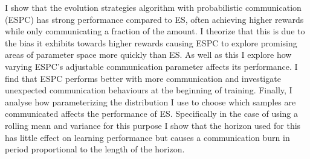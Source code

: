 I show that the evolution strategies algorithm with probabilistic communication (ESPC) has strong performance compared to ES, often achieving higher rewards while only communicating a fraction of the amount. I theorize that this is due to the bias it exhibits towards higher rewards causing ESPC to explore promising areas of parameter space more quickly than ES.
As well as this I explore how varying ESPC's adjustable communication parameter affects its performance. I find that ESPC performs better with more communication and investigate unexpected communication behaviours at the beginning of training. Finally, I analyse how parameterizing the distribution I use to choose which samples are communicated affects the performance of ES. Specifically in the case of using a rolling mean and variance for this purpose I show that the horizon used for this has little effect on learning performance but causes a communication burn in period proportional to the length of the horizon.
